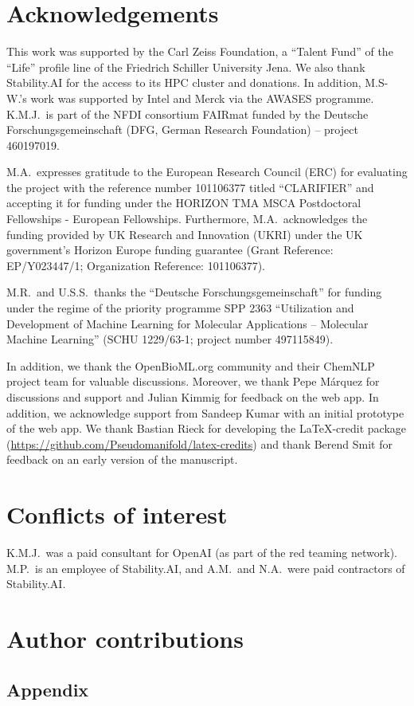 \documentclass[11pt, oneside]{article}
\begin{document}
\begin{refsection}
\section*{Acknowledgements}
This work was supported by the Carl Zeiss Foundation, a \enquote{Talent Fund} of the \enquote{Life} profile line of the Friedrich Schiller University Jena.
We also thank Stability.AI for the access to its HPC cluster and donations. In addition, M.S-W.'s work was supported by Intel and Merck via the AWASES programme. 
K.M.J.\ is part of the NFDI consortium FAIRmat funded by the Deutsche Forschungsgemeinschaft (DFG, German Research Foundation) – project 460197019.

M.A.\ expresses gratitude to the European Research Council (ERC) for evaluating the project with the reference number 101106377 titled \enquote{CLARIFIER} and accepting it for funding under the HORIZON TMA MSCA Postdoctoral Fellowships - European Fellowships. 
Furthermore, M.A.\ acknowledges the funding provided by UK Research and Innovation (UKRI) under the UK government’s Horizon Europe funding guarantee (Grant Reference: EP/Y023447/1; Organization Reference: 101106377).

M.R.\ and U.S.S.\ thanks the \enquote{Deutsche Forschungsgemeinschaft} for funding under the regime of the priority programme SPP 2363 \enquote{Utilization and Development of Machine Learning for Molecular Applications – Molecular Machine Learning} (SCHU 1229/63-1; project number 497115849).

In addition, we thank the OpenBioML.org community and their ChemNLP project team for valuable discussions.
Moreover, we thank Pepe Márquez for discussions and support and Julian Kimmig for feedback on the web app. 
In addition, we acknowledge support from Sandeep Kumar with an initial prototype of the web app.
We thank Bastian Rieck for developing the \LaTeX-credit package (\url{https://github.com/Pseudomanifold/latex-credits}) and thank Berend Smit for feedback on an early version of the manuscript.

\section*{Conflicts of interest}
K.M.J.\ was a paid consultant for OpenAI (as part of the red teaming network). M.P.\ is an employee of Stability.AI, and A.M.\ and N.A.\ were paid contractors of Stability.AI.

\section*{Author contributions}

\scriptsize
\insertcredits
\normalsize
\printbibliography
\end{refsection}

\clearpage
\begin{refsection}
\appendix
\section{Appendix}

\clearpage
\printbibliography[heading=subbibintoc]
\end{refsection}
\end{document}
